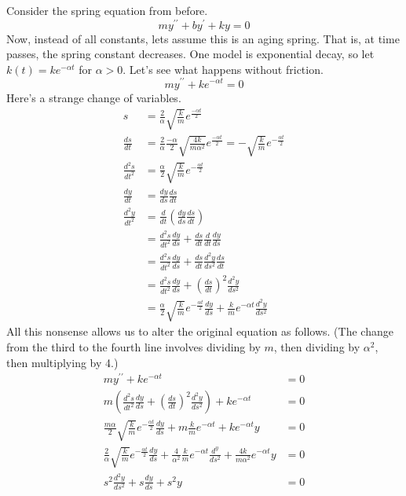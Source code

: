 \documentclass[fleqn,letterpaper]{report}
\begin{document}
Consider the spring equation from before.
\begin{equation*}
my^{\prime \prime} + by^\prime + ky = 0
\end{equation*}
Now, instead of all constants, lets assume this is an
aging spring. That is, at time passes, the spring constant
decreases. One model is exponential decay, so let $k(t) = ke^{-\alpha
t}$ for $\alpha > 0$. Let's see what happens without friction.
\begin{equation*}
m y^{\prime \prime} + ke^{-\alpha t} = 0 
\end{equation*}
Here's a strange change of variables.
\begin{align*}
s & = \frac{2}{\alpha} \sqrt{\frac{k}{m}} e^{\frac{-\alpha t}{2}} \\
\frac{ds}{dt} & = \frac{2}{\alpha} \frac{-\alpha}{2} \sqrt{
\frac{4k}{m\alpha^2}} e^{\frac{-\alpha t}{2}} = -
\sqrt{\frac{k}{m}} e^{-\frac{\alpha t}{2}} \\
\frac{d^2s}{dt^2} & = \frac{\alpha}{2} \sqrt{\frac{k}{m}}
e^{-\frac{\alpha t}{2}} \\
\frac{dy}{dt} & = \frac{dy}{ds} \frac{ds}{dt} \\
\frac{d^2 y}{dt^2} & = \frac{d}{dt} \left( \frac{dy}{ds}
\frac{ds}{dt} \right) \\
& = \frac{d^2 s}{dt^2} \frac{dy}{ds} + \frac{ds}{dt}
\frac{d}{dt} \frac{dy}{ds} \\
& = \frac{d^2 s}{dt^2} \frac{dy}{ds} + \frac{ds}{dt}
\frac{d^2y}{ds^2} \frac{ds}{dt} \\
& = \frac{d^2 s}{dt^2} \frac{dy}{ds} + \left( \frac{ds}{dt}
\right)^2 \frac{d^2 y}{ds^2} \\
& = \frac{\alpha}{2} \sqrt{\frac{k}{m}} e^{-\frac{\alpha
t}{2}} \frac{dy}{ds} + \frac{k}{m} e^{-\alpha t} \frac{d^2
y}{ds^2}
\end{align*}
All this nonsense allows us to alter the original
equation as follows. (The change from the third to the fourth
line involves dividing by $m$, then dividing by $\alpha^2$,
then multiplying by 4.)
\begin{align*}
m y^{\prime \prime} + ke^{-\alpha t} & = 0 \\
m \left(\frac{d^2 s}{dt^2} \frac{dy}{ds} + \left( \frac{ds}{dt}
\right)^2 \frac{d^2 y}{ds^2} \right) + ke^{-\alpha t} & = 0 \\
\frac{m\alpha}{2} \sqrt{\frac{k}{m}} e^{-\frac{\alpha t}{2}}
\frac{dy}{ds} + m \frac{k}{m} e^{-\alpha t} + k e^{-\alpha t} y
& = 0 \\
\frac{2}{\alpha} \sqrt{\frac{k}{m}} e^{-\frac{\alpha t}{2}}
\frac{dy}{ds} + \frac{4}{\alpha^2} \frac{k}{m} e^{-\alpha t}
\frac{d^y}{ds^2} + \frac{4k}{m\alpha^2} e^{-\alpha t} y & = 0 \\
s^2 \frac{d^2y}{ds^2} + s \frac{dy}{ds} + s^2 y & = 0 
\end{align*}
\end{document}
